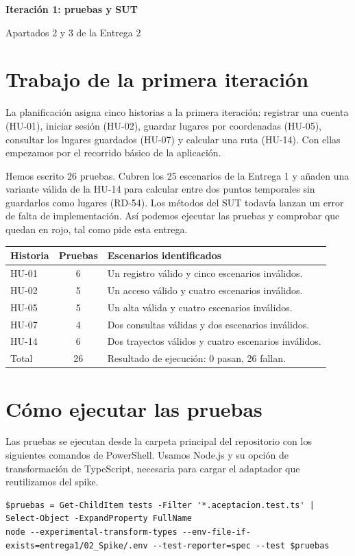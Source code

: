 \documentclass[10pt,a4paper]{article}
\begin{document}
\setcounter{page}{5}
{\LARGE\bfseries Iteración 1: pruebas y SUT}\par
{\large Apartados 2 y 3 de la Entrega 2}\par

\section*{Trabajo de la primera iteración}
La planificación asigna cinco historias a la primera iteración: registrar una cuenta (HU-01), iniciar sesión (HU-02), guardar lugares por coordenadas (HU-05), consultar los lugares guardados (HU-07) y calcular una ruta (HU-14). Con ellas empezamos por el recorrido básico de la aplicación.

Hemos escrito 26 pruebas. Cubren los 25 escenarios de la Entrega 1 y añaden una variante válida de la HU-14 para calcular entre dos puntos temporales sin guardarlos como lugares (RD-54). Los métodos del SUT todavía lanzan un error de falta de implementación. Así podemos ejecutar las pruebas y comprobar que quedan en rojo, tal como pide esta entrega.

\begin{center}
\begin{tabularx}{\linewidth}{l c X}
\toprule
Historia & Pruebas & Escenarios identificados\\
\midrule
HU-01 & 6 & Un registro válido y cinco escenarios inválidos.\\
HU-02 & 5 & Un acceso válido y cuatro escenarios inválidos.\\
HU-05 & 5 & Un alta válida y cuatro escenarios inválidos.\\
HU-07 & 4 & Dos consultas válidas y dos escenarios inválidos.\\
HU-14 & 6 & Dos trayectos válidos y cuatro escenarios inválidos.\\
\midrule
Total & 26 & Resultado de ejecución: 0 pasan, 26 fallan.\\
\bottomrule
\end{tabularx}
\end{center}

\section*{Cómo ejecutar las pruebas}
Las pruebas se ejecutan desde la carpeta principal del repositorio con los siguientes comandos de PowerShell. Usamos Node.js y su opción de transformación de TypeScript, necesaria para cargar el adaptador que reutilizamos del spike.
\begin{lstlisting}
$pruebas = Get-ChildItem tests -Filter '*.aceptacion.test.ts' | Select-Object -ExpandProperty FullName
node --experimental-transform-types --env-file-if-exists=entrega1/02_Spike/.env --test-reporter=spec --test $pruebas
\end{lstlisting}
\end{document}
